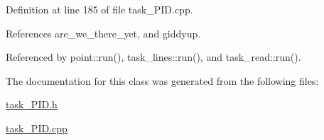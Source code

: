 Definition at line 185 of file task\-\_\-\-P\-I\-D.\-cpp.



References are\-\_\-we\-\_\-there\-\_\-yet, and giddyup.



Referenced by point\-::run(), task\-\_\-lines\-::run(), and task\-\_\-read\-::run().



The documentation for this class was generated from the following files\-:\begin{DoxyCompactItemize}
\item 
\hyperlink{task__PID_8h}{task\-\_\-\-P\-I\-D.\-h}\item 
\hyperlink{task__PID_8cpp}{task\-\_\-\-P\-I\-D.\-cpp}\end{DoxyCompactItemize}
